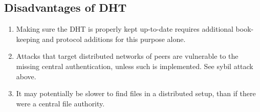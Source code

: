 \subsection{Disadvantages of DHT}
\begin{enumerate}
    \item Making sure the DHT is properly kept up-to-date requires additional
        book-keeping and protocol additions for this purpose alone.
    \item Attacks that target distributed networks of peers are vulnerable to
        the missing central authentication, unless such is implemented. See
        sybil attack above.
    \item It may potentially be slower to find files in a distributed setup,
        than if there were a central file authority.
\end{enumerate}
